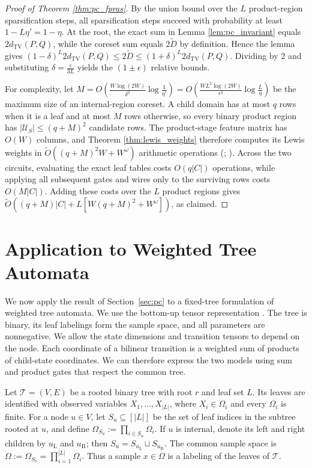 \documentclass{article}
\begin{document}
\begin{proof}[Proof of Theorem \ref{thm:pc_fpras}]
By the union bound over the $L$ product-region sparsification steps, all sparsification steps succeed with probability at least $1 - L\eta' = 1 - \eta$. At the root, the exact sum in Lemma \ref{lem:pc_invariant} equals $2d_{\mathrm{TV}}(P,Q)$, while the coreset sum equals $2\widetilde D$ by definition. Hence the lemma gives $(1-\delta)^L 2d_{\mathrm{TV}}(P,Q) \le 2\widetilde D \le (1+\delta)^L 2d_{\mathrm{TV}}(P,Q)$. Dividing by $2$ and substituting $\delta = \frac{\epsilon}{3L}$ yields the $(1 \pm \epsilon)$ relative bounds.

For complexity, let $M=O\left(\frac{W\log(2W)}{\delta^2}\log\frac{1}{\eta'}\right)=O\left(\frac{WL^2\log(2W)}{\epsilon^2}\log\frac{L}{\eta}\right)$ be the maximum size of an internal-region coreset. A child domain has at most $q$ rows when it is a leaf and at most $M$ rows otherwise, so every binary product region has $|\mathcal{U}_S|\leq(q+M)^2$ candidate rows. The product-stage feature matrix has $O(W)$ columns, and Theorem \ref{thm:lewis_weights} therefore computes its Lewis weights in $\widetilde{O}\left((q+M)^2W+W^\omega\right)$ arithmetic operations (\cite[Theorem 5.3.1]{lee2016faster}; \cite[Lemma 2.5]{jambulapati2022improved}). Across the two circuits, evaluating the exact leaf tables costs $O(q|C|)$ operations, while applying all subsequent gates and wires only to the surviving rows costs $O(M|C|)$. Adding these costs over the $L$ product regions gives $\widetilde{O}\left((q+M)|C|+L[W(q+M)^2+W^\omega]\right)$, as claimed.
\end{proof}

\section{Application to Weighted Tree Automata}
We now apply the result of Section~\ref{sec:pc} to a fixed-tree
formulation of weighted tree automata. We use the bottom-up tensor
representation \cite{FulopVogler09,RabusseauBalleCohen16}.
The tree is binary, its leaf labelings form the sample space, and
all parameters are nonnegative. We allow the state dimensions and
transition tensors to depend on the node. Each coordinate of a
bilinear transition is a weighted sum of products of child-state
coordinates. We can therefore express the two models using sum
and product gates that respect the common tree.

Let $\mathcal{T}=(V,E)$ be a rooted binary tree with root $r$ and leaf set $L$. Its leaves are identified with observed variables $X_1,\ldots,X_{|L|}$, where $X_i\in\Omega_i$ and every $\Omega_i$ is finite. For a node $u\in V$, let $S_u\subseteq[|L|]$ be the set of leaf indices in the subtree rooted at $u$, and define $\Omega_{S_u}:=\prod_{i\in S_u}\Omega_i$. If $u$ is internal, denote its left and right children by $u_{\mathrm L}$ and $u_{\mathrm R}$; then $S_u=S_{u_{\mathrm L}}\sqcup S_{u_{\mathrm R}}$. The common sample space is $\Omega:=\Omega_{S_r}=\prod_{i=1}^{|L|}\Omega_i$. Thus a sample $x\in\Omega$ is a labeling of the leaves of $\mathcal{T}$.
\end{document}
